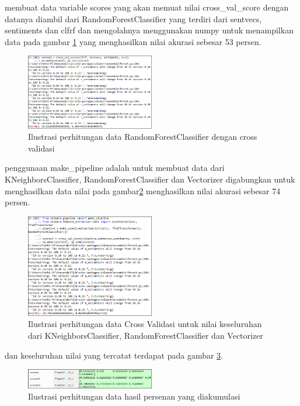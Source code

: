 \begin{enumerate}
\subitem membuat data variable scores yang akan memuat nilai cross\_val\_score dengan datanya diambil dari RandomForestClassifier yang terdiri dari sentvecs, sentiments dan clfrf dan mengolahnya menggunakan numpy untuk menampilkan data pada gambar \ref{fig38} yang menghasilkan nilai akurasi sebesar 53 persen. 
\begin{figure}[!htbp]
	\centering
	\includegraphics[width=0.5\textwidth]{figures/fathi/chapter5/hari4/5}
	\caption{Ilustrasi perhitungan data  RandomForestClassifier dengan cross validasi}
	\label{fig38}
\end{figure}

\subitem penggunaan make\_pipeline adalah untuk membuat data dari KNeighborsClassifier, RandomForestClassifier dan Vectorizer digabungkan untuk menghasilkan data nilai pada gambar\ref{fig39} menghasilkan nilai akurasi sebesar 74 persen. 
\begin{figure}[!htbp]
	\centering
	\includegraphics[width=0.5\textwidth]{figures/fathi/chapter5/hari4/6}
	\caption{Ilustrasi perhitungan data Cross Validasi untuk nilai keseluruhan dari KNeighborsClassifier, RandomForestClassifier dan Vectorizer}
	\label{fig39}
\end{figure}

dan keseluruhan nilai yang tercatat terdapat pada gambar \ref{fig40}.
\begin{figure}[!htbp]
	\centering
	\includegraphics[width=0.5\textwidth]{figures/fathi/chapter5/hari4/7}
	\caption{Ilustrasi perhitungan data hasil persenan yang diakumulasi}
	\label{fig40}
\end{figure}

\end{enumerate}